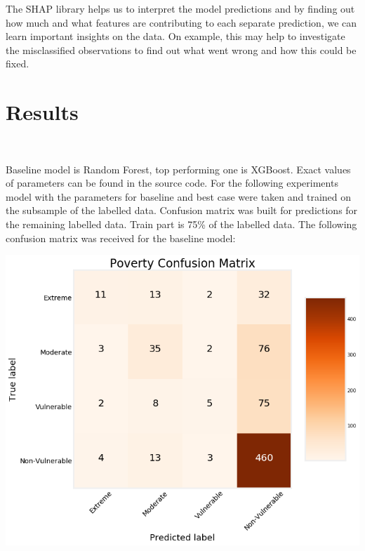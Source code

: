     The SHAP library helps us to interpret the model predictions and by finding out how much and what features are contributing to each separate prediction, we can learn important insights on the data. On example, this may help to investigate the misclassified observations to find out what went wrong and how this could be fixed.
    
\section{Results}~~~

    Baseline model is Random Forest, top performing one is XGBoost. Exact values of parameters can be found in the source code. %
    For the following experiments model with the parameters for baseline and best case were taken and trained on the subsample of the labelled data. Confusion matrix was built for predictions for the remaining labelled data. Train part is 75\% of the labelled data. The following confusion matrix was received for the baseline model:
    \begin{center}
        \includegraphics[width=\textwidth]{images/confusion_matrix_rf.png}
    \end{center}

